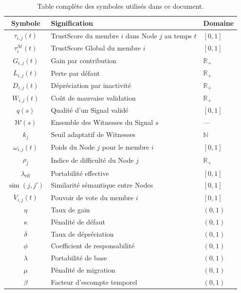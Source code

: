 \documentclass[12pt,a4paper]{article}
\theoremstyle{definition}
\theoremstyle{plain}
\theoremstyle{remark}
\newcommand{\trustscore}{\tau}
\newcommand{\R}{\mathbb{R}}
\newcommand{\N}{\mathbb{N}}
\newcommand{\1}{\mathbf{1}}
\begin{document}
\begin{table}[H]
\centering
\caption{Table complète des symboles utilisés dans ce document.}
\begin{tabular}{cll}
\toprule
\textbf{Symbole} & \textbf{Signification} & \textbf{Domaine} \\
\midrule
$\trustscore_{i,j}(t)$ & TrustScore du membre $i$ dans Node $j$ au temps $t$ & $[0,1]$ \\
$\trustscore_i^{\mathcal{M}}(t)$ & TrustScore Global du membre $i$ & $[0,1]$ \\
$G_{i,j}(t)$ & Gain par contribution & $\R_+$ \\
$L_{i,j}(t)$ & Perte par défaut & $\R_+$ \\
$D_{i,j}(t)$ & Dépréciation par inactivité & $\R_+$ \\
$W_{i,j}(t)$ & Coût de mauvaise validation & $\R_+$ \\
$q(s)$ & Qualité d'un Signal validé & $[0,1]$ \\
$\mathcal{W}(s)$ & Ensemble des Witnesses du Signal $s$ & --- \\
$k_j$ & Seuil adaptatif de Witnesses & $\N$ \\
$\omega_{i,j}(t)$ & Poids du Node $j$ pour le membre $i$ & $[0,1]$ \\
$\rho_j$ & Indice de difficulté du Node $j$ & $\R_+$ \\
$\lambda_{\text{eff}}$ & Portabilité effective & $[0,1]$ \\
$\operatorname{sim}(j,j')$ & Similarité sémantique entre Nodes & $[0,1]$ \\
$V_{i,j}(t)$ & Pouvoir de vote du membre $i$ & $[0,1]$ \\
$\eta$ & Taux de gain & $(0,1)$ \\
$\kappa$ & Pénalité de défaut & $(0,1)$ \\
$\delta$ & Taux de dépréciation & $(0,1)$ \\
$\phi$ & Coefficient de responsabilité & $(0,1)$ \\
$\lambda$ & Portabilité de base & $(0,1)$ \\
$\mu$ & Pénalité de migration & $(0,1)$ \\
$\beta$ & Facteur d'escompte temporel & $(0,1)$ \\
\bottomrule
\end{tabular}
\end{table}
\end{document}
